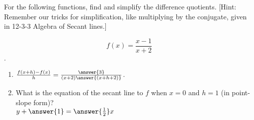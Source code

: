 \documentclass{ximera}
\author{Elizabeth Campolongo}
\begin{document}
\begin{exercise}

For the following functions, 
find and simplify the difference quotients. [Hint: Remember our tricks for simplification, like multiplying by the conjugate, given in 12-3-3 Algebra of Secant lines.]

$$f(x)= \frac{x-1}{x+2}$$.

\begin{enumerate}

\item $\frac{f(x+h)-f(x)}{h} = \frac{\answer{3}}{(x+2)\answer{(x+h+2)}}$.  

\item What is the equation of the secant line to $f$ when $x = 0$ and $h=1$ (in point-slope form)?\\
$y+ \answer{1} = \answer{\frac{1}{2}}x$
	
\end{enumerate}
\end{exercise}
\end{document}
